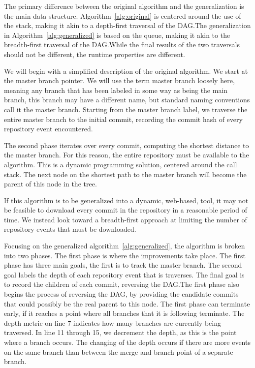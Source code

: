 \documentclass[draft]{IEEEtran}
\begin{document}
The primary difference between the original algorithm and the
generalization is the main data structure. Algorithm~\ref{alg:original}
is centered around the use of the stack, making it akin to a depth-first
traversal of the DAG.\@ The generalization in
Algorithm~\ref{alg:generalized} is based on the queue, making it akin to
the breadth-first traversal of the DAG.\@ While the final results of the
two traversals should not be different, the runtime properties are
different.

We will begin with a simplified description of the original algorithm.
We start at the master branch pointer. We will use the term master
branch loosely here, meaning any branch that has been labeled in some
way as being the main branch, this branch may have a different name, but
standard naming conventions call it the master branch. Starting from the
master branch label, we traverse the entire master branch to the initial
commit, recording the commit hash of every repository event encountered.

The second phase iterates over every commit, computing the shortest
distance to the master branch. For this reason, the entire repository
must be available to the algorithm. This is a dynamic programming
solution, centered around the call stack. The next node on the shortest
path to the master branch will become the parent of this node in the
tree.

If this algorithm is to be generalized into a dynamic, web-based, tool,
it may not be feasible to download every commit in the repository in a
reasonable period of time. We instead look toward a breadth-first
approach at limiting the number of repository events that must be
downloaded.

Focusing on the generalized algorithm~\ref{alg:generalized}, the
algorithm is broken into two phases. The first phase is where the
improvements take place. The first phase has three main goals, the first
is to track the master branch. The second goal labels the depth of each
repository event that is traverses. The final goal is to record the
children of each commit, reversing the DAG.\@ The first phase also
begins the process of reversing the DAG, by providing the candidate
commits that could possibly be the real parent to this node. The first
phase can terminate early, if it reaches a point where all branches that
it is following terminate. The depth metric on line 7 indicates how many
branches are currently being traversed. In line 11 through 15, we
decrement the depth, as this is the point where a branch occurs. The
changing of the depth occurs if there are more events on the same branch
than between the merge and branch point of a separate branch.
\end{document}
